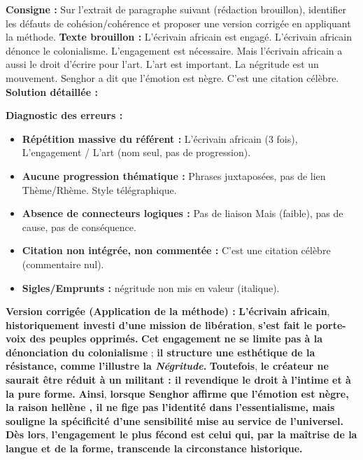 \documentclass[11pt]{article}
\begin{document}
\begin{exoresolu}
\textbf{Consigne :} Sur l'extrait de paragraphe suivant (rédaction brouillon), identifier les défauts de cohésion/cohérence et proposer une version corrigée en appliquant la méthode.
\textbf{Texte brouillon :} \og L'écrivain africain est engagé. L'écrivain africain dénonce le colonialisme. L'engagement est nécessaire. Mais l'écrivain africain a aussi le droit d'écrire pour l'art. L'art est important. La négritude est un mouvement. Senghor a dit que l'émotion est nègre. C'est une citation célèbre. \fg
\tcblower
\textbf{Solution détaillée :}

\textbf{Diagnostic des erreurs :}
\begin{itemize}
    \item \textbf{Répétition massive du référent :} \og L'écrivain africain \fg (3 fois), \og L'engagement \fg / \og L'art \fg (nom seul, pas de progression).
    \item \textbf{Aucune progression thématique :} Phrases juxtaposées, pas de lien Thème/Rhème. Style télégraphique.
    \item \textbf{Absence de connecteurs logiques :} Pas de liaison \og Mais \fg (faible), pas de cause, pas de conséquence.
    \item \textbf{Citation non intégrée, non commentée :} \og C'est une citation célèbre \fg (commentaire nul).
    \item \textbf{Sigles/Emprunts :} \og négritude \fg non mis en valeur (italique).
\end{itemize}

\textbf{Version corrigée (Application de la méthode) :}
\og \textbf{L'écrivain africain}, \textbf{historiquement investi d'une mission de libération}, \textbf{s'est fait le porte-voix des peuples opprimés.} \textbf{Cet engagement} \textbf{ne se limite pas à la dénonciation du colonialisme} ; \textbf{il structure une esthétique de la résistance, comme l'illustre la \emph{Négritude}.} \textbf{Toutefois}, \textbf{le créateur ne saurait être réduit à un militant : il revendique le droit à l'intime et à la pure forme.} \textbf{Ainsi}, \textbf{lorsque Senghor affirme que \og l'émotion est nègre, la raison hellène \fg, il ne fige pas l'identité dans l'essentialisme, mais souligne la spécificité d'une sensibilité mise au service de l'universel.} \textbf{Dès lors}, \textbf{l'engagement le plus fécond est celui qui, par la maîtrise de la langue et de la forme, transcende la circonstance historique.} \fg


\end{exoresolu}
\end{document}
